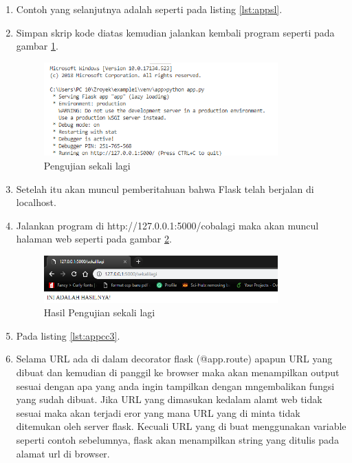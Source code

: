\begin{enumerate}
\item Contoh yang selanjutnya adalah seperti pada listing \ref{lst:appsl}.


\item Simpan skrip kode diatas kemudian jalankan kembali program seperti pada gambar \ref{fig:ujisl}.
\begin{figure}[!htbp]
	\centerline{\includegraphics[width=0.85\textwidth]{figures/9/ujisl.PNG}}
	\caption{Pengujian sekali lagi}
	\label{fig:ujisl}
\end{figure}

\item Setelah itu akan muncul pemberitahuan bahwa Flask telah berjalan di localhost.
\item Jalankan program di http://127.0.0.1:5000/cobalagi maka akan muncul halaman web seperti pada gambar \ref{fig:hujisl}.
\begin{figure}[!htbp]
	\centerline{\includegraphics[width=0.85\textwidth]{figures/9/hujisl.PNG}}
	\caption{Hasil Pengujian sekali lagi}
	\label{fig:hujisl}
\end{figure}

\item Pada listing \ref{lst:appcc3}.


\item Selama URL ada di dalam decorator flask (@app.route) apapun URL yang dibuat dan kemudian di panggil ke browser maka akan menampilkan output sesuai dengan apa yang anda ingin tampilkan dengan mngembalikan fungsi yang sudah dibuat. Jika URL yang dimasukan kedalam alamt web tidak sesuai maka akan terjadi eror yang mana URL yang di minta tidak ditemukan oleh server flask. Kecuali URL yang di buat menggunakan variable seperti contoh sebelumnya, flask akan menampilkan string yang ditulis pada alamat url di browser.


\end{enumerate}
